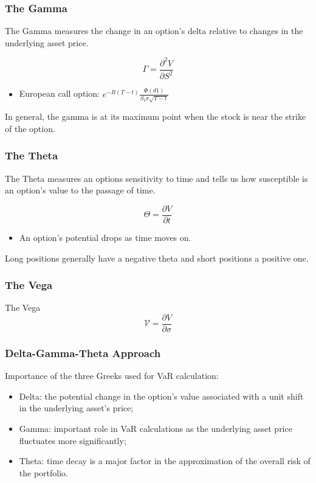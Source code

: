 \documentclass{beamer}
\begin{document}
\begin{frame}
    \frametitle{The Gamma}
    The Gamma measures the change in an option's 
    delta relative to changes in the underlying
    asset price.\pause

    \begin{block}{}
        $$
        \Gamma = \frac{\partial^2 V}{\partial S^2}
        $$
    \end{block}
    \pause
    \begin{itemize}
        \item European call option: $e^{-R(T-t)}\frac{\Phi(d1)}{S_t\sigma\sqrt{T-t}}$
    \end{itemize}
    \vspace{0.3cm}
    \pause 
    In general, the gamma is at its maximum point when the stock is near the 
    strike of the option.
\end{frame}

\begin{frame}
    \frametitle{The Theta}
    The Theta measures an options sensitivity to time 
    and tells us how susceptible is an option's value 
    to the passage of time.\pause

    \begin{block}{}
        $$
        \Theta = \frac{\partial V}{\partial t}
        $$  
    \end{block}\pause
    \vspace{0.3cm}
    \begin{itemize}
        \item An option's potential drops as time moves on. 
    \end{itemize}\pause
    \vspace{0.3cm}
    Long positions generally have a negative theta and 
    short positions a positive one.
    
\end{frame}

\begin{frame}
    \frametitle{The Vega}
    \begin{block}{The Vega}
        $$ 
        \mathcal{V}  = \frac{\partial V}{\partial \sigma}
        $$  
    \end{block}
\end{frame}

\begin{frame}
    \frametitle{Delta-Gamma-Theta Approach}
    Importance of the three Greeks used for VaR calculation:
    \begin{itemize}
        \item Delta: the potential change 
        in the option's value associated with a 
        unit shift in the underlying asset's price;
        \item Gamma: important role in 
        VaR calculations as the underlying asset price 
        fluctuates more significantly;
        \item Theta: time decay is a major factor
        in the approximation of the overall risk of the portfolio.
    \end{itemize}
\end{frame}
\end{document}
